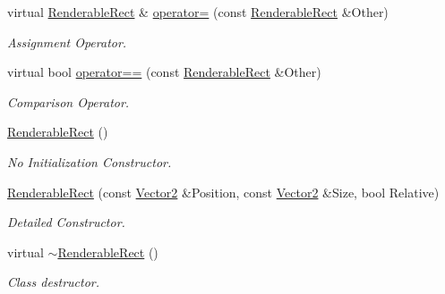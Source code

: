 \begin{DoxyCompactItemize}
\item 
virtual \hyperlink{structMezzanine_1_1UI_1_1RenderableRect}{RenderableRect} \& \hyperlink{structMezzanine_1_1UI_1_1RenderableRect_ab93ab3f67ab27f221fdda5730b959be0}{operator=} (const \hyperlink{structMezzanine_1_1UI_1_1RenderableRect}{RenderableRect} \&Other)
\begin{DoxyCompactList}\small\item\em Assignment Operator. \item\end{DoxyCompactList}\item 
virtual bool \hyperlink{structMezzanine_1_1UI_1_1RenderableRect_a2da1af5227c8958bc047f9d315c9b7cd}{operator==} (const \hyperlink{structMezzanine_1_1UI_1_1RenderableRect}{RenderableRect} \&Other)
\begin{DoxyCompactList}\small\item\em Comparison Operator. \item\end{DoxyCompactList}\item 
\hyperlink{structMezzanine_1_1UI_1_1RenderableRect_a92a23fe9e3de387d118b5350d31fe8be}{RenderableRect} ()
\begin{DoxyCompactList}\small\item\em No Initialization Constructor. \item\end{DoxyCompactList}\item 
\hyperlink{structMezzanine_1_1UI_1_1RenderableRect_a22e6469509e95787d02b16da0962de3a}{RenderableRect} (const \hyperlink{classMezzanine_1_1Vector2}{Vector2} \&Position, const \hyperlink{classMezzanine_1_1Vector2}{Vector2} \&Size, bool Relative)
\begin{DoxyCompactList}\small\item\em Detailed Constructor. \item\end{DoxyCompactList}\item 
\hypertarget{structMezzanine_1_1UI_1_1RenderableRect_ae8a333321b6939caa4d65d100faa8106}{
virtual \hyperlink{structMezzanine_1_1UI_1_1RenderableRect_ae8a333321b6939caa4d65d100faa8106}{$\sim$RenderableRect} ()}
\label{structMezzanine_1_1UI_1_1RenderableRect_ae8a333321b6939caa4d65d100faa8106}

\begin{DoxyCompactList}\small\item\em Class destructor. \item\end{DoxyCompactList}\end{DoxyCompactItemize}

